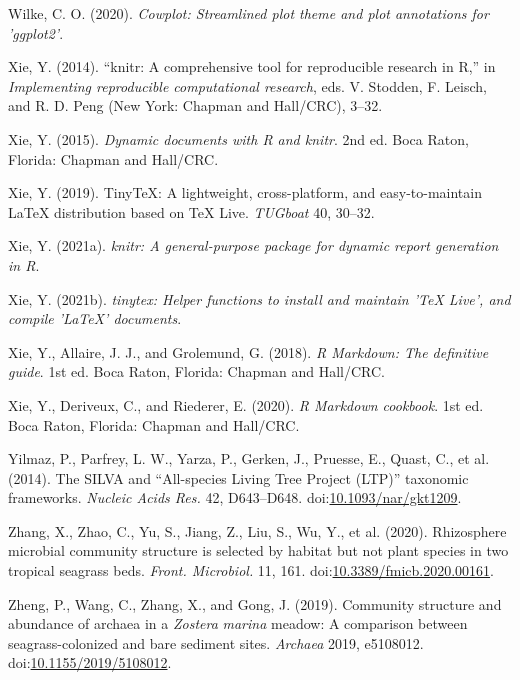 \documentclass[12pt,]{article}
\begin{document}
\leavevmode\hypertarget{ref-Wilke2020}{}%
Wilke, C. O. (2020). \emph{Cowplot: Streamlined plot theme and plot
annotations for 'ggplot2'}.

\leavevmode\hypertarget{ref-Xie2014}{}%
Xie, Y. (2014). ``knitr: A comprehensive tool for reproducible research
in R,'' in \emph{Implementing reproducible computational research}, eds.
V. Stodden, F. Leisch, and R. D. Peng (New York: Chapman and Hall/CRC),
3--32.

\leavevmode\hypertarget{ref-Xie2015}{}%
Xie, Y. (2015). \emph{Dynamic documents with R and knitr}. 2nd ed. Boca
Raton, Florida: Chapman and Hall/CRC.

\leavevmode\hypertarget{ref-Xie2019}{}%
Xie, Y. (2019). TinyTeX: A lightweight, cross-platform, and
easy-to-maintain LaTeX distribution based on TeX Live. \emph{TUGboat}
40, 30--32.

\leavevmode\hypertarget{ref-Xie2021}{}%
Xie, Y. (2021a). \emph{knitr: A general-purpose package for dynamic
report generation in R}.

\leavevmode\hypertarget{ref-Xie2021a}{}%
Xie, Y. (2021b). \emph{tinytex: Helper functions to install and maintain
'TeX Live', and compile 'LaTeX' documents}.

\leavevmode\hypertarget{ref-Xie2018}{}%
Xie, Y., Allaire, J. J., and Grolemund, G. (2018). \emph{R Markdown: The
definitive guide}. 1st ed. Boca Raton, Florida: Chapman and Hall/CRC.

\leavevmode\hypertarget{ref-Xie2020}{}%
Xie, Y., Deriveux, C., and Riederer, E. (2020). \emph{R Markdown
cookbook}. 1st ed. Boca Raton, Florida: Chapman and Hall/CRC.

\leavevmode\hypertarget{ref-Yilmaz2014a}{}%
Yilmaz, P., Parfrey, L. W., Yarza, P., Gerken, J., Pruesse, E., Quast,
C., et al. (2014). The SILVA and ``All-species Living Tree Project
(LTP)'' taxonomic frameworks. \emph{Nucleic Acids Res.} 42, D643--D648.
doi:\href{https://doi.org/10.1093/nar/gkt1209}{10.1093/nar/gkt1209}.

\leavevmode\hypertarget{ref-Zhang2020}{}%
Zhang, X., Zhao, C., Yu, S., Jiang, Z., Liu, S., Wu, Y., et al. (2020).
Rhizosphere microbial community structure is selected by habitat but not
plant species in two tropical seagrass beds. \emph{Front. Microbiol.}
11, 161.
doi:\href{https://doi.org/10.3389/fmicb.2020.00161}{10.3389/fmicb.2020.00161}.

\leavevmode\hypertarget{ref-Zheng2019}{}%
Zheng, P., Wang, C., Zhang, X., and Gong, J. (2019). Community structure
and abundance of archaea in a \emph{} \emph{Zostera} \emph{marina}
meadow: A comparison between seagrass-colonized and bare sediment sites.
\emph{Archaea} 2019, e5108012.
doi:\href{https://doi.org/10.1155/2019/5108012}{10.1155/2019/5108012}.
\end{document}
